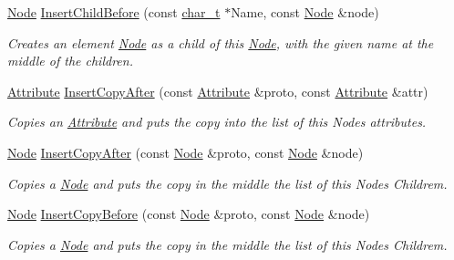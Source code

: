 \begin{DoxyCompactItemize}
\hyperlink{classMezzanine_1_1xml_1_1Node}{Node} \hyperlink{classMezzanine_1_1xml_1_1Node_a5b5a42904325d45ebbe734ee33a028cb}{InsertChildBefore} (const \hyperlink{namespaceMezzanine_1_1xml_a29b8a47c179e9895c4e9e66c45d1dbbc}{char\_\-t} $\ast$Name, const \hyperlink{classMezzanine_1_1xml_1_1Node}{Node} \&node)
\begin{DoxyCompactList}\small\item\em Creates an element \hyperlink{classMezzanine_1_1xml_1_1Node}{Node} as a child of this \hyperlink{classMezzanine_1_1xml_1_1Node}{Node}, with the given name at the middle of the children. \item\end{DoxyCompactList}\item 
\hyperlink{classMezzanine_1_1xml_1_1Attribute}{Attribute} \hyperlink{classMezzanine_1_1xml_1_1Node_a6d8a04ed89f3ccc331c1d85d6a690d21}{InsertCopyAfter} (const \hyperlink{classMezzanine_1_1xml_1_1Attribute}{Attribute} \&proto, const \hyperlink{classMezzanine_1_1xml_1_1Attribute}{Attribute} \&attr)
\begin{DoxyCompactList}\small\item\em Copies an \hyperlink{classMezzanine_1_1xml_1_1Attribute}{Attribute} and puts the copy into the list of this Nodes attributes. \item\end{DoxyCompactList}\item 
\hyperlink{classMezzanine_1_1xml_1_1Node}{Node} \hyperlink{classMezzanine_1_1xml_1_1Node_ad122538f533fc0fe4fb8d747025eeca2}{InsertCopyAfter} (const \hyperlink{classMezzanine_1_1xml_1_1Node}{Node} \&proto, const \hyperlink{classMezzanine_1_1xml_1_1Node}{Node} \&node)
\begin{DoxyCompactList}\small\item\em Copies a \hyperlink{classMezzanine_1_1xml_1_1Node}{Node} and puts the copy in the middle the list of this Nodes Childrem. \item\end{DoxyCompactList}\item 
\hyperlink{classMezzanine_1_1xml_1_1Node}{Node} \hyperlink{classMezzanine_1_1xml_1_1Node_ab622185e44a06fc03436039e160292e6}{InsertCopyBefore} (const \hyperlink{classMezzanine_1_1xml_1_1Node}{Node} \&proto, const \hyperlink{classMezzanine_1_1xml_1_1Node}{Node} \&node)
\begin{DoxyCompactList}\small\item\em Copies a \hyperlink{classMezzanine_1_1xml_1_1Node}{Node} and puts the copy in the middle the list of this Nodes Childrem. \item\end{DoxyCompactList}\item 

\end{DoxyCompactItemize}

